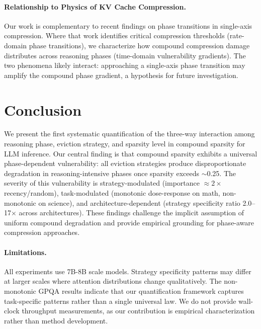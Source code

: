 \documentclass[11pt]{article}
\begin{document}
\paragraph{Relationship to Physics of KV Cache Compression.}
Our work is complementary to recent findings on phase transitions in single-axis compression. Where that work identifies critical compression thresholds (rate-domain phase transitions), we characterize how compound compression damage distributes across reasoning phases (time-domain vulnerability gradients). The two phenomena likely interact: approaching a single-axis phase transition may amplify the compound phase gradient, a hypothesis for future investigation.

\section{Conclusion}

We present the first systematic quantification of the three-way interaction among reasoning phase, eviction strategy, and sparsity level in compound sparsity for LLM inference. Our central finding is that compound sparsity exhibits a universal phase-dependent vulnerability: all eviction strategies produce disproportionate degradation in reasoning-intensive phases once sparsity exceeds $\sim$0.25. The severity of this vulnerability is strategy-modulated (importance $\approx 2\times$ recency/random), task-modulated (monotonic dose-response on math, non-monotonic on science), and architecture-dependent (strategy specificity ratio 2.0--17$\times$ across architectures). These findings challenge the implicit assumption of uniform compound degradation and provide empirical grounding for phase-aware compression approaches.

\paragraph{Limitations.}
All experiments use 7B-8B scale models. Strategy specificity patterns may differ at larger scales where attention distributions change qualitatively. The non-monotonic GPQA results indicate that our quantification framework captures task-specific patterns rather than a single universal law. We do not provide wall-clock throughput measurements, as our contribution is empirical characterization rather than method development.
\end{document}
